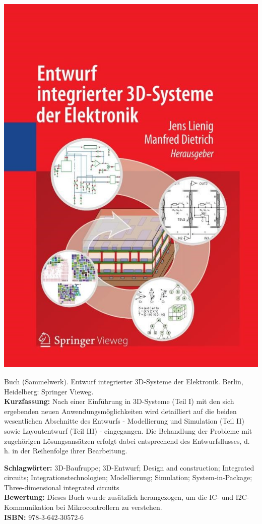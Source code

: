 {
\begin{minipage}{0.38\textwidth}
	\includegraphics[width=\linewidth]{images/Lienig.jpg}
\end{minipage}
\hfill
\begin{minipage}{0.6\textwidth}
Buch (Sammelwerk). Entwurf integrierter 3D-Systeme der Elektronik.
Berlin, Heidelberg: Springer Vieweg.
\\ \textbf{Kurzfassung:}
Nach einer Einführung in 3D-Systeme (Teil I) mit den sich ergebenden neuen Anwendungsmöglichkeiten wird detailliert auf die beiden wesentlichen Abschnitte des Entwurfs - Modellierung und Simulation (Teil II) sowie Layoutentwurf (Teil III) - eingegangen. Die Behandlung der Probleme mit zugehörigen Lösungsansätzen erfolgt dabei entsprechend des Entwurfsflusses, d. h. in der Reihenfolge ihrer Bearbeitung.
\end{minipage}
\textbf{Schlagwörter:}
3D-Baufruppe; 3D-Entwurf; Design and construction; Integrated circuits; Integrationstechnologien; Modellierung; Simulation; System-in-Package; Three-dimensional integrated circuits
\\ \textbf{Bewertung:}
Dieses Buch wurde zusätzlich herangezogen, um die IC- und I2C-Kommunikation bei Mikrocontrollern zu verstehen.
\\ \textbf{ISBN:}
978-3-642-30572-6
}

